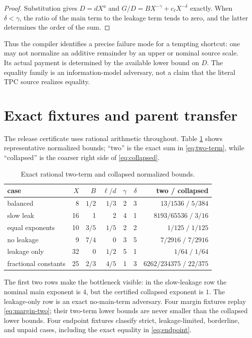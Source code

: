 \documentclass[11pt]{article}
\begin{document}
\begin{proof}
Substitution gives $D=dX^a$ and
$G/D=BX^{-\gamma}+c_\ell X^{-\delta}$ exactly.  When $\delta<\gamma$,
the ratio of the main term to the leakage term tends to zero, and the latter
determines the order of the sum.
\end{proof}

Thus the compiler identifies a precise failure mode for a tempting shortcut:
one may not normalize an additive remainder by an upper or nominal source
scale.  Its actual payment is determined by the available lower bound on $D$.
The equality family is an information-model adversary, not a claim that the
literal TPC source realizes equality.

\section{Exact fixtures and parent transfer}

The release certificate uses rational arithmetic throughout.  Table
\ref{tab:budget} shows representative normalized bounds; ``two'' is the exact
sum in \eqref{eq:two-term}, while ``collapsed'' is the coarser right side of
\eqref{eq:collapsed}.

\begin{table}[ht]
\centering\small
\begin{tabular}{lrrrrrr}
\toprule
case & $X$ & $B$ & $\ell/d$ & $\gamma$ & $\delta$ & two / collapsed\\
\midrule
balanced & 8 & $1/2$ & $1/3$ & 2 & 3 & $13/1536\; /\;5/384$\\
slow leak & 16 & 1 & 2 & 4 & 1 & $8193/65536\; /\;3/16$\\
equal exponents & 10 & $3/5$ & $1/5$ & 2 & 2 & $1/125\; /\;1/125$\\
no leakage & 9 & $7/4$ & 0 & 3 & 5 & $7/2916\; /\;7/2916$\\
leakage only & 32 & 0 & $1/2$ & 5 & 1 & $1/64\; /\;1/64$\\
fractional constants & 25 & $2/3$ & $4/5$ & 1 & 3 & $6262/234375\; /\;22/375$\\
\bottomrule
\end{tabular}
\caption{Exact rational two-term and collapsed normalized bounds.}
\label{tab:budget}
\end{table}

The first two rows make the bottleneck visible: in the slow-leakage row the
nominal main exponent is $4$, but the certified collapsed exponent is $1$.
The leakage-only row is an exact no-main-term adversary.  Four margin fixtures
replay \eqref{eq:margin-two}; their two-term lower bounds are never smaller
than the collapsed lower bounds.  Four endpoint fixtures classify strict,
leakage-limited, borderline, and unpaid cases, including the exact equality
in \eqref{eq:endpoint}.
\end{document}

